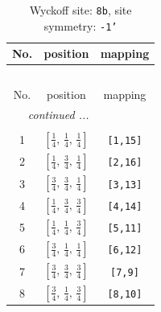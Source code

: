 \documentclass[fleqn,8pt]{jsarticle}
\begin{document}
\begin{longtable}{ccc}
\caption{Wyckoff site: {\tt 8b}, site symmetry: {\tt -1'}}
 \\
 \hline \hline
No. & position & mapping \\ \hline \endfirsthead

\multicolumn{2}{l}{\tablename\ \thetable{}} \\
 \hline \hline
No. & position & mapping \\ \hline \endhead

 \hline \hline
\multicolumn{2}{r}{\footnotesize\it continued ...} \\ \endfoot

 \hline \hline
\multicolumn{2}{r}{} \\ \endlastfoot

1 & $\left[ \frac{1}{4},\, \frac{1}{4},\, \frac{1}{4} \right]$ & {\tt [1,15]} \\ \hline
2 & $\left[ \frac{1}{4},\, \frac{3}{4},\, \frac{1}{4} \right]$ & {\tt [2,16]} \\ \hline
3 & $\left[ \frac{3}{4},\, \frac{3}{4},\, \frac{1}{4} \right]$ & {\tt [3,13]} \\ \hline
4 & $\left[ \frac{1}{4},\, \frac{3}{4},\, \frac{3}{4} \right]$ & {\tt [4,14]} \\ \hline
5 & $\left[ \frac{1}{4},\, \frac{1}{4},\, \frac{3}{4} \right]$ & {\tt [5,11]} \\ \hline
6 & $\left[ \frac{3}{4},\, \frac{1}{4},\, \frac{1}{4} \right]$ & {\tt [6,12]} \\ \hline
7 & $\left[ \frac{3}{4},\, \frac{3}{4},\, \frac{3}{4} \right]$ & {\tt [7,9]} \\ \hline
8 & $\left[ \frac{3}{4},\, \frac{1}{4},\, \frac{3}{4} \right]$ & {\tt [8,10]} \\
\end{longtable}
\renewcommand{\arraystretch}{1.2}
\end{document}
